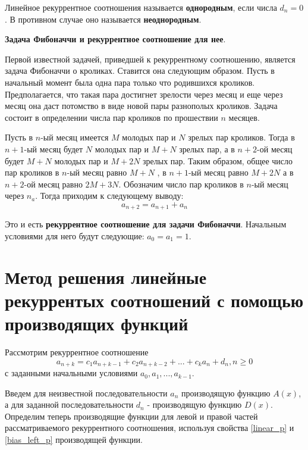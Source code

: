 \vspace{5mm}

Линейное рекуррентное соотношения называется \textbf{однородным}, если числа $d_n = 0$. В 
противном случае оно называется \textbf{неоднородным}.

\vspace{5mm}

\textbf{Задача Фибоначчи и рекуррентное соотношение для нее}.
 
Первой известной задачей, приведшей к рекуррентному соотношению,
является задача Фибоначчи о кроликах. Ставится она следующим
образом. Пусть в начальный момент была одна пара только что
родившихся кроликов. Предполагается, что такая пара достигнет зрелости
через месяц и еще через месяц она даст потомство в виде новой пары
разнополых кроликов. Задача состоит в определении числа пар кроликов
по прошествии $n$ месяцев.

Пусть в $n$-ый месяц имеется $M$ молодых пар и $N$ зрелых пар кроликов. 
Тогда в $n+1$-ый месяц будет $N$ молодых пар и $M + N$ зрелых пар, а в $n+2$-ой
месяц будет $M + N$ молодых пар и $M + 2N$ зрелых пар. Таким образом, общее число
пар кроликов в $n$-ый месяц равно $M + N$ , в $n+1$-ый месяц равно $M + 2N$
а в $n+2$-ой месяц равно $2M + 3N$. Обозначим число пар кроликов в $n$-ый месяц 
через $n_a$. Тогда приходим к следующему выводу:
\begin{equation}
    a_{n+2} = a_{n+1} + a_n
\end{equation}

Это и есть \textbf{рекуррентное соотношение для задачи Фибоначчи}. Начальным условиями для него
будут следующие: $a_0 = a_1 = 1$.

\section{Метод решения линейные рекуррентых соотношений с помощью производящих функций}
Рассмотрим рекуррентное соотношение
\begin{equation*}
    a_{n+k} = c_1 a_{n+k-1} + c_2 a_{n+k-2} + ... + c_k a_n + d_n, n \geq 0
\end{equation*}
с заданными начальными условиями $a_0, a_1, ..., a_{k-1}$.

Введем для неизвестной последовательности $a_n$ производящую функцию $A(x)$, а для заданной
последовательности $d_n$ - производящую функцию $D(x)$. Определим теперь производящие функции для
левой и правой частей рассматриваемого рекуррентного соотношения, используя свойства \ref{linear_p} и \ref{bias_left_p} производящей
функции.

